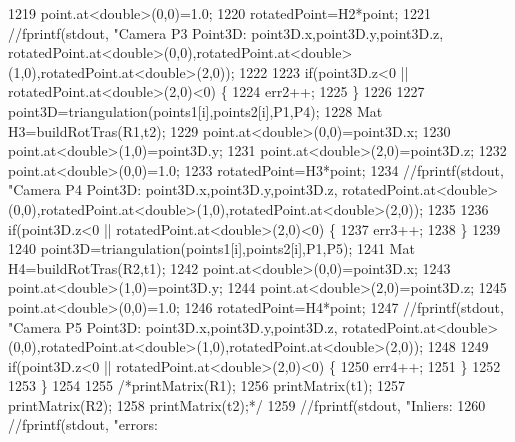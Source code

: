 \begin{DoxyCode}
1219         point.at<\textcolor{keywordtype}{double}>(0,0)=1.0;
1220         rotatedPoint=H2*point;
1221         \textcolor{comment}{//fprintf(stdout, "Camera P3 Point3D: %
       point3D.x,point3D.y,point3D.z, rotatedPoint.at<double>(0,0),rotatedPoint.at<double>(1,0),rotatedPoint.at<double>(2,0));}
1222 
1223         \textcolor{keywordflow}{if}(point3D.z<0 || rotatedPoint.at<\textcolor{keywordtype}{double}>(2,0)<0) \{
1224             err2++;
1225         \}
1226 
1227         point3D=triangulation(points1[i],points2[i],P1,P4);
1228         Mat H3=buildRotTras(R1,t2);
1229         point.at<\textcolor{keywordtype}{double}>(0,0)=point3D.x;
1230         point.at<\textcolor{keywordtype}{double}>(1,0)=point3D.y;
1231         point.at<\textcolor{keywordtype}{double}>(2,0)=point3D.z;
1232         point.at<\textcolor{keywordtype}{double}>(0,0)=1.0;
1233         rotatedPoint=H3*point;
1234         \textcolor{comment}{//fprintf(stdout, "Camera P4 Point3D: %
       point3D.x,point3D.y,point3D.z, rotatedPoint.at<double>(0,0),rotatedPoint.at<double>(1,0),rotatedPoint.at<double>(2,0));}
1235 
1236         \textcolor{keywordflow}{if}(point3D.z<0 || rotatedPoint.at<\textcolor{keywordtype}{double}>(2,0)<0) \{
1237             err3++;
1238         \}
1239 
1240         point3D=triangulation(points1[i],points2[i],P1,P5);
1241         Mat H4=buildRotTras(R2,t1);
1242         point.at<\textcolor{keywordtype}{double}>(0,0)=point3D.x;
1243         point.at<\textcolor{keywordtype}{double}>(1,0)=point3D.y;
1244         point.at<\textcolor{keywordtype}{double}>(2,0)=point3D.z;
1245         point.at<\textcolor{keywordtype}{double}>(0,0)=1.0;
1246         rotatedPoint=H4*point;
1247         \textcolor{comment}{//fprintf(stdout, "Camera P5 Point3D: %
       point3D.x,point3D.y,point3D.z, rotatedPoint.at<double>(0,0),rotatedPoint.at<double>(1,0),rotatedPoint.at<double>(2,0));}
1248 
1249         \textcolor{keywordflow}{if}(point3D.z<0 || rotatedPoint.at<\textcolor{keywordtype}{double}>(2,0)<0) \{
1250             err4++;
1251         \}
1252 
1253     \}
1254 
1255     \textcolor{comment}{/*printMatrix(R1);}
1256 \textcolor{comment}{    printMatrix(t1);}
1257 \textcolor{comment}{    printMatrix(R2);}
1258 \textcolor{comment}{    printMatrix(t2);*/}
1259     \textcolor{comment}{//fprintf(stdout, "Inliers: %
1260     \textcolor{comment}{//fprintf(stdout, "errors: %
}}
\end{DoxyCode}
